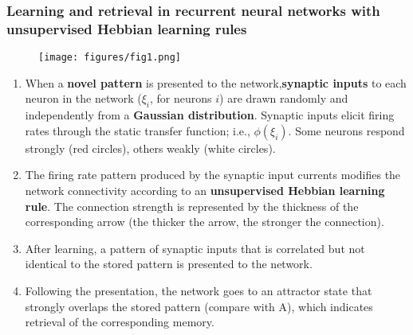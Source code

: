\documentclass{beamer}
\begin{document}
\begin{frame}
    \frametitle{Learning and retrieval in recurrent neural networks with
    unsupervised Hebbian learning rules}

    \begin{figure}[ht!]
        \centering
        \texttt{[image: figures/fig1.png]}
    \label{fig:1}
\end{figure}

\begin{enumerate}[label=(\Alph*)]
    \tiny
\item When a \textbf{novel pattern} is presented to the network,\textbf{synaptic
        inputs} to each neuron in the network ($\xi_i$, for neurons $i$)
        are drawn randomly and independently from a \textbf{Gaussian
        distribution}.  Synaptic inputs elicit firing rates through the static transfer function; i.e., 
        $\phi(\xi_i)$. Some neurons respond strongly (red circles), others weakly (white circles).
    \item The firing rate pattern produced by the synaptic input currents
        modifies the network connectivity according to an \textbf{unsupervised
        Hebbian learning rule}. The connection strength is represented by the
        thickness of the corresponding arrow (the thicker the arrow, the
        stronger the connection).
    \item After learning, a pattern of synaptic inputs that is correlated
        but not identical to the stored pattern is presented to the network.
    \item Following the presentation, the network goes to an attractor
        state that strongly overlaps the stored pattern (compare with A),
        which indicates retrieval of the corresponding memory.
\end{enumerate}
\end{frame}
\end{document}
